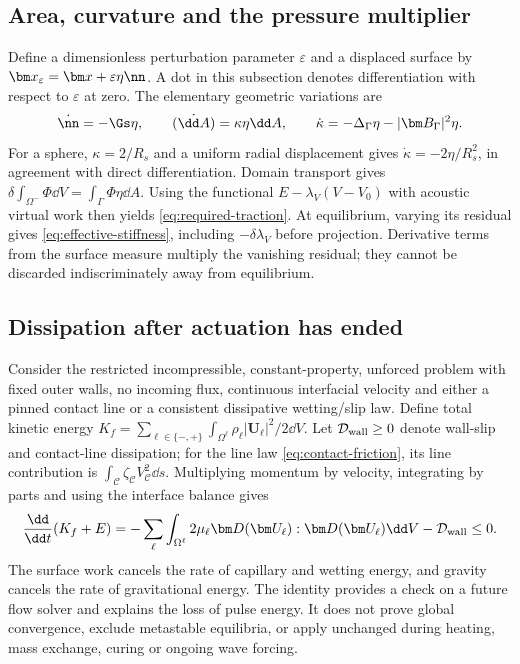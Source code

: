 \subsection{Area, curvature and the pressure multiplier}
Define a dimensionless perturbation parameter $\varepsilon$ and a displaced
surface by $\bm x_\varepsilon=\bm x+\varepsilon\eta\nn$. A dot in this
subsection denotes differentiation with respect to $\varepsilon$ at zero.
The elementary geometric variations are
\begin{equation}
 \dot{\nn}=-\Gs\eta,\qquad
 \dot{(\dd A)}=\kappa\eta\dd A,\qquad
 \dot\kappa=-\Delta_\Gamma\eta-|\bm B_\Gamma|^2\eta.
 \label{eq:geometric-variations}
\end{equation}
For a sphere, $\kappa=2/R_s$ and a uniform radial displacement gives
$\dot\kappa=-2\eta/R_s^2$, in agreement with direct differentiation. Domain
transport gives $\delta\int_{\Omega^-}\Phi\dd V=\int_\Gamma\Phi\eta\dd A$.
Using the functional $E-\lambda_V(V-V_0)$ with acoustic virtual work then
yields \cref{eq:required-traction}. At equilibrium, varying its residual gives
\cref{eq:effective-stiffness}, including $-\delta\lambda_V$ before projection.
Derivative terms from the surface measure multiply the vanishing residual;
they cannot be discarded indiscriminately away from equilibrium.

\subsection{Dissipation after actuation has ended}
Consider the restricted incompressible, constant-property, unforced problem
with fixed outer walls, no incoming flux, continuous interfacial velocity and
either a pinned contact line or a consistent dissipative wetting/slip law.
Define total kinetic energy
$K_f=\sum_{\ell\in\{-,+\}}\int_{\Omega^\ell}
\rho_\ell|\bm U_\ell|^2/2\dd V$. Let $\mathcal D_{\rm wall}\geq0$ denote
wall-slip and contact-line dissipation; for the line law
\cref{eq:contact-friction}, its line contribution is
$\int_{\mathcal C}\zeta_{\mathcal C}V_{\mathcal C}^2\dd s$. Multiplying
momentum by velocity, integrating by parts and using the interface balance
gives
\begin{equation}
 \frac{\dd}{\dd t}(K_f+E)
 =-\sum_\ell\int_{\Omega^\ell}2\mu_\ell
                  \bm D(\bm U_\ell):\bm D(\bm U_\ell)\dd V
   -\mathcal D_{\rm wall}\leq0.
 \label{eq:passive-energy-decay}
\end{equation}
The surface work cancels the rate of capillary and wetting energy, and gravity
cancels the rate of gravitational energy. The identity provides a check on a
future flow solver and explains the loss of pulse energy. It does not prove
global convergence, exclude metastable equilibria, or apply unchanged during
heating, mass exchange, curing or ongoing wave forcing.

